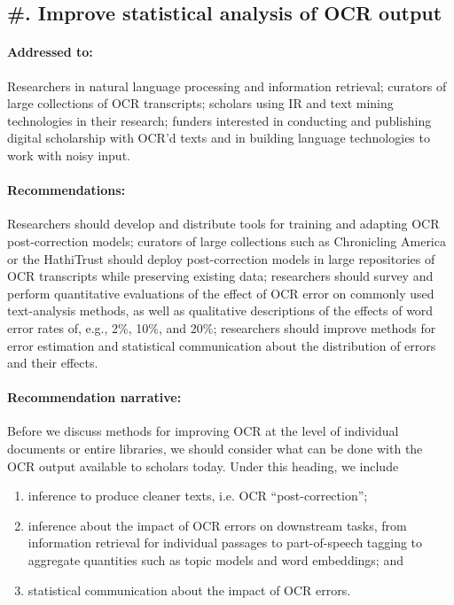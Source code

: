 \documentclass[twoside,11pt]{report}
\newcounter{reccounter}
\renewcommand{\thereccounter}{\arabic{reccounter}}
\newcommand{\recommend}[2]{\refstepcounter{reccounter}%
  \label{rec:#1}%
  \subsection{\#\thereccounter. #2}%
  \label{sec:rec-#1}}
\begin{document}
\recommend{stats}{Improve statistical analysis of OCR output}

\paragraph{Addressed to:} Researchers in natural language processing and information retrieval; curators of large collections of OCR transcripts; scholars using IR and text mining technologies in their research; funders interested in conducting and publishing digital scholarship with OCR'd texts and in building language technologies to work with noisy input.

\paragraph{Recommendations:} Researchers should develop and distribute tools for training and adapting OCR post-correction models; curators of large collections such as Chronicling America or the HathiTrust should deploy post-correction models in large repositories of OCR transcripts while preserving existing data; researchers should survey and perform quantitative evaluations of the effect of OCR error on commonly used text-analysis methods, as well as qualitative descriptions of the effects of word error rates of, e.g., 2\%, 10\%, and 20\%; researchers should improve methods for error estimation and statistical communication about the distribution of errors and their effects.

\paragraph{Recommendation narrative:}

Before we discuss methods for improving OCR at the level of individual documents or entire libraries, we should consider what can be done with the OCR output available to scholars today. Under this heading, we include
\begin{enumerate}

\item inference to produce cleaner texts, i.e. OCR ``post-correction'';

\item inference about the impact of OCR errors on downstream tasks, from information retrieval for individual passages to part-of-speech tagging to aggregate quantities such as topic models and word embeddings; and

\item statistical communication about the impact of OCR errors.

\end{enumerate}
\end{document}
